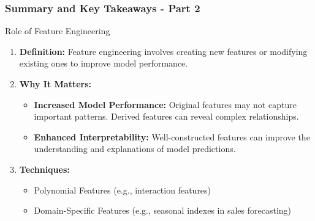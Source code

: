 \documentclass[aspectratio=169]{beamer}
\begin{document}
\begin{frame}[fragile]
    \frametitle{Summary and Key Takeaways - Part 2}
    
    \begin{block}{Role of Feature Engineering}
        \begin{enumerate}
            \item \textbf{Definition:} 
            Feature engineering involves creating new features or modifying existing ones to improve model performance.
            
            \item \textbf{Why It Matters:}
                \begin{itemize}
                    \item \textbf{Increased Model Performance:} Original features may not capture important patterns. Derived features can reveal complex relationships.
                    \item \textbf{Enhanced Interpretability:} Well-constructed features can improve the understanding and explanations of model predictions.
                \end{itemize}
            
            \item \textbf{Techniques:}
                \begin{itemize}
                    \item Polynomial Features (e.g., interaction features)
                    \item Domain-Specific Features (e.g., seasonal indexes in sales forecasting)
                \end{itemize}
        \end{enumerate}
    \end{block}

\end{frame}
\end{document}
